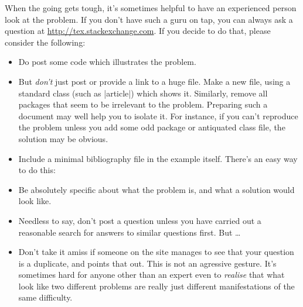 When the going gets tough, it's sometimes helpful to have an experienced person look at the problem. If you don't have such a guru on tap, you can always ask a question at \url{http://tex.stackexchange.com}. If you decide to do that, please consider the following:
\begin{itemize}
\item Do post some code which illustrates the problem.
\item But \emph{don't} just post or provide a link to a huge file. Make a new file, using a standard class (such as |article|) which shows it. Similarly, remove all packages that seem to be irrelevant to the problem. Preparing such a document may well help you to isolate it. For instance, if you can't reproduce the problem unless you add some odd package or antiquated class file, the solution may be obvious.
\item Include a minimal bibliography file in the example
  itself. There's an easy way to do this:
\item Be absolutely specific about what the problem is, and what a
  solution would look like.
\item Needless to say, don't post a question unless you have carried
  out a reasonable search for answers to similar questions first. But
  \ldots\
\item Don't take it amiss if someone on the site manages to see that
  your question is a duplicate, and points that out. This is not an
  agressive gesture. It's sometimes hard for anyone other than an
  expert even to \emph{realise} that what look like two different
  problems are really just different manifestations of the same
  difficulty.
\end{itemize}

